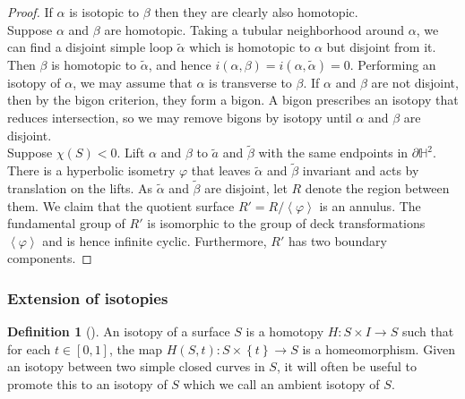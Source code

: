 \documentclass[reqno]{amsart}
\theoremstyle{definition}
\newtheorem{definition}[theorem]{Definition}
\theoremstyle{remark}
\begin{document}
\begin{proof}
    If $\alpha$ is isotopic to $\beta$ then they are clearly also
    homotopic.\\
    \linebreak
    Suppose $\alpha$ and $\beta$ are homotopic. Taking a
    tubular neighborhood around $\alpha$, we can find
    a disjoint simple loop $\tilde{\alpha}$ which is homotopic to
    $\alpha$ but disjoint from it. Then $\beta$ is homotopic
    to $\tilde{\alpha}$, and hence
    $i \left( \alpha, \beta \right) 
    = i \left( \alpha, \tilde{\alpha} \right) = 0$.
    Performing an isotopy of $\alpha$, we may assume that
    $\alpha$ is transverse to $\beta$.
    If $\alpha$ and $\beta$ are not disjoint, then by
    the bigon criterion, they form a bigon. A bigon
    prescribes an isotopy that reduces intersection, so we
    may remove bigons by isotopy until $\alpha$ and $\beta$ are
    disjoint.\\
    \linebreak
    Suppose $\chi (S) <0$. Lift $\alpha$ and $\beta$ to
    $\tilde{a}$ and $\tilde{\beta}$ with the
    same endpoints in $\partial \mathbb{H}^2$. There
    is a hyperbolic isometry $\varphi$ that leaves
    $\tilde{\alpha}$ and $\tilde{\beta}$ invariant and
    acts by translation on the lifts. As $\tilde{\alpha}$ and
    $\tilde{\beta}$ are disjoint, let $R$ denote the region
    between them. We claim that the quotient surface
    $R' = R / \left<\varphi \right>$ is an annulus.
    The fundamental group of $R'$ is isomorphic to the group of
    deck transformations $\left<\varphi \right>$ and is hence
    infinite cyclic. Furthermore, $R'$ has two boundary components.
\end{proof}


\subsubsection{Extension of isotopies}

\begin{definition}[]
    An isotopy of a surface $S$ is a homotopy $H \colon 
    S \times I \to S$ such that for each
    $t \in \left[ 0,1 \right] $, the map
    $H \left( S, t \right) \colon S \times \left\{ t \right\} \to 
    S$ is a homeomorphism. Given an isotopy between
    two simple closed curves in $S$, it will often be useful
    to promote this to an isotopy of $S$ which we call an
    ambient isotopy of $S$.
\end{definition}
\end{document}
